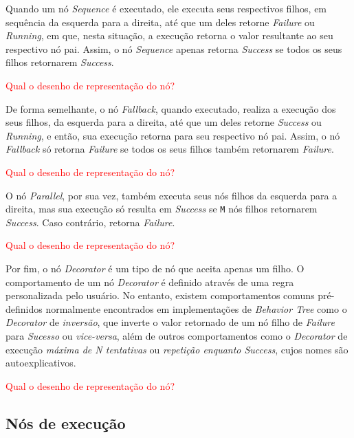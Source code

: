 \documentclass[conference]{IEEEtran}
\newcommand{\red}{\textcolor{red}}
\begin{document}

Quando um nó \textit{Sequence} é executado, ele executa seus respectivos filhos, em sequência da esquerda para a direita, até que um deles retorne \textit{Failure} ou \textit{Running}, em que, nesta situação, a execução retorna o valor resultante ao seu respectivo nó pai. Assim, o nó \textit{Sequence} apenas retorna \textit{Success} se todos os seus filhos retornarem \textit{Success}. 

\red{Qual o desenho de representação do nó?}

De forma semelhante, o nó \textit{Fallback}, quando executado, realiza a execução dos seus filhos, da esquerda para a direita, até que um deles retorne \textit{Success} ou \textit{Running}, e então, sua execução retorna para seu respectivo nó pai. Assim, o nó \textit{Fallback} só retorna \textit{Failure} se todos os seus filhos também retornarem \textit{Failure}.

\red{Qual o desenho de representação do nó?}

O nó \textit{Parallel}, por sua vez, também executa seus nós filhos da esquerda para a direita, mas sua execução só resulta em \textit{Success} se \texttt{M} nós filhos retornarem \textit{Success}. Caso contrário, retorna \textit{Failure}.

\red{Qual o desenho de representação do nó?}

Por fim, o nó \textit{Decorator} é um tipo de nó que aceita apenas um filho. O comportamento de um nó \textit{Decorator} é definido através de uma regra personalizada pelo usuário. No entanto, existem comportamentos comuns pré-definidos normalmente encontrados em implementações de \textit{Behavior Tree} como o \textit{Decorator} de \textit{inversão}, que inverte o valor retornado de um nó filho de \textit{Failure} para \textit{Sucesso} ou \textit{vice-versa}, além de outros comportamentos como o \textit{Decorator} de execução \textit{máxima de N tentativas} ou \textit{repetição enquanto Success}, cujos nomes são autoexplicativos.

\red{Qual o desenho de representação do nó?}

\subsection{Nós de execução}
\end{document}
